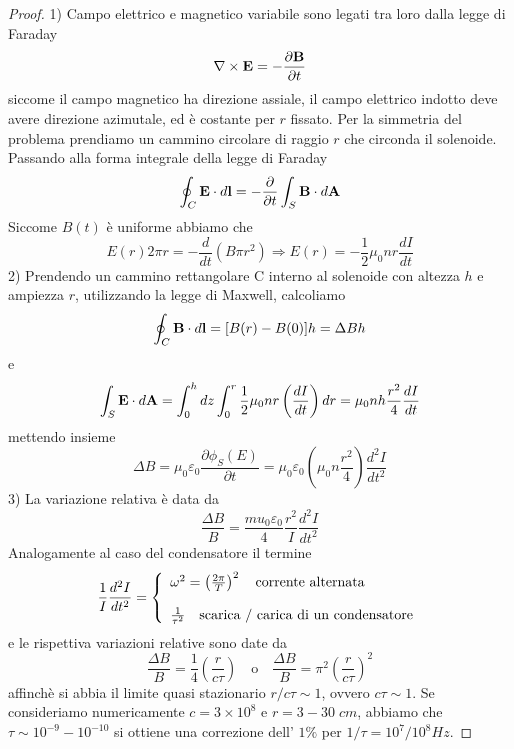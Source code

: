 \begin{proof}
1)  Campo elettrico e magnetico variabile sono legati tra loro dalla legge di Faraday
\begin{equation*}
	\nabla \times \bold{E} = - \frac{\partial \bold{B}}{\partial t}
\end{equation*}
siccome il campo magnetico ha direzione assiale, il campo elettrico indotto deve avere direzione azimutale, ed \`e costante per $r$ fissato. Per la simmetria del problema prendiamo un cammino circolare di raggio $r$ che circonda il solenoide. Passando alla forma integrale della legge di Faraday
\begin{equation*}
	\oint_{C} \bold{E} \cdot d \bold{l} = - \frac{\partial}{\partial t} \int_{S} \bold{B} \cdot d\bold{A}
\end{equation*} 
Siccome $B(t)$ \`e uniforme abbiamo che 
\begin{equation*}
	E(r)2 \pi r = - \frac{d}{dt}(B \pi r^2) \Rightarrow E(r) = -\frac{1}{2}\mu_0 n r \frac{dI}{dt}
\end{equation*}
2) Prendendo un cammino rettangolare  C interno al solenoide con altezza $h$ e ampiezza $r$, utilizzando la legge di Maxwell, calcoliamo
\begin{equation*}
	\oint_{C} \bold{B} \cdot d \bold{l} = [B(r) - B(0)]h = \Delta B h
\end{equation*}  
e 
\begin{equation*}
	\int_{S} \bold{E} \cdot d\bold{A} = \int_{0}^{h}dz \int_{0}^{r} \frac{1}{2}\mu_0 n r \left(\frac{dI}{dt}\right)dr = \mu_0 n h \frac{r^2}{4}\frac{dI}{dt} 
\end{equation*}
mettendo insieme 
\begin{equation*}
	\Delta B = \mu_0 \varepsilon_0 \frac{\partial \phi_{S}(E)}{\partial t} = \mu_0 \varepsilon_0 \left(\mu_0 n \frac{r^2}{4}\right) \frac{d^2I}{dt^2}
\end{equation*}
3) La variazione relativa \`e data da 
\begin{equation*}
	\frac{\Delta B}{B} = \frac{mu_0 \varepsilon_0}{4} \frac{r^2}{I} \frac{d^2I}{dt^2}
\end{equation*}
Analogamente al caso del condensatore il termine 
\begin{align*}
	\frac{1}{I}\frac{d^2I}{dt^2} = \left \{ \begin{array}{l}
		\omega^2 = \left(\frac{2\pi}{T}\right)^2 \quad \text{corrente alternata} \\ \rule{0pt}{20pt}
		\frac{1}{\tau^2} \quad \text{scarica / carica di un condensatore}
	\end{array}\right.
\end{align*}
e le rispettiva variazioni relative sono date da 
\begin{equation*}
	\frac{\Delta B}{B} = \frac{1}{4} \left(\frac{r}{c \tau}\right) \quad \text{o} \quad \frac{\Delta B}{B} = \pi^2 \left(\frac{r}{c \tau}\right)^2
\end{equation*} 
affinch\`e si abbia il limite quasi stazionario $r/c\tau \sim 1$, ovvero $c \tau \sim 1$. 
Se consideriamo numericamente $c = 3 \times 10^8$ e $r = 3 - 30\;cm$, abbiamo che $\tau \sim 10^{-9} -10^{-10}$ si ottiene una correzione dell' $1 \%$ per $1/\tau = 10^7/10^8 Hz$.


\end{proof}
